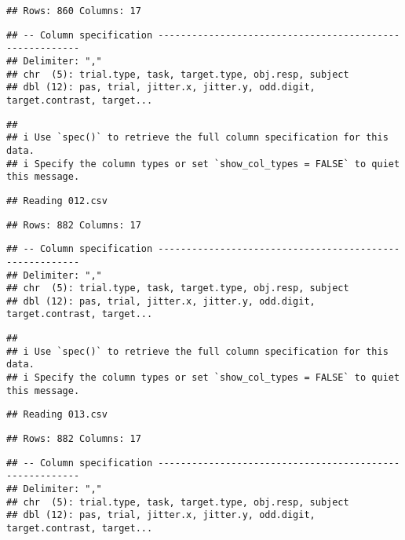 \documentclass[
]{article}
\begin{document}
\begin{verbatim}
## Rows: 860 Columns: 17
\end{verbatim}

\begin{verbatim}
## -- Column specification --------------------------------------------------------
## Delimiter: ","
## chr  (5): trial.type, task, target.type, obj.resp, subject
## dbl (12): pas, trial, jitter.x, jitter.y, odd.digit, target.contrast, target...
\end{verbatim}

\begin{verbatim}
## 
## i Use `spec()` to retrieve the full column specification for this data.
## i Specify the column types or set `show_col_types = FALSE` to quiet this message.
\end{verbatim}

\begin{verbatim}
## Reading 012.csv
\end{verbatim}

\begin{verbatim}
## Rows: 882 Columns: 17
\end{verbatim}

\begin{verbatim}
## -- Column specification --------------------------------------------------------
## Delimiter: ","
## chr  (5): trial.type, task, target.type, obj.resp, subject
## dbl (12): pas, trial, jitter.x, jitter.y, odd.digit, target.contrast, target...
\end{verbatim}

\begin{verbatim}
## 
## i Use `spec()` to retrieve the full column specification for this data.
## i Specify the column types or set `show_col_types = FALSE` to quiet this message.
\end{verbatim}

\begin{verbatim}
## Reading 013.csv
\end{verbatim}

\begin{verbatim}
## Rows: 882 Columns: 17
\end{verbatim}

\begin{verbatim}
## -- Column specification --------------------------------------------------------
## Delimiter: ","
## chr  (5): trial.type, task, target.type, obj.resp, subject
## dbl (12): pas, trial, jitter.x, jitter.y, odd.digit, target.contrast, target...
\end{verbatim}
\end{document}
